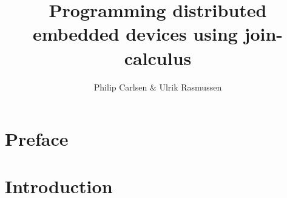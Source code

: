 \documentclass[a4paper, oneside, draft]{memoir}
\title{Programming distributed embedded devices using join-calculus}
\author{Philip Carlsen \& Ulrik Rasmussen}
\begin{document}
\frontmatter

\maketitle

\begin{abstract}

\end{abstract}

\clearpage
\chapter*{Preface}


\clearpage

\tableofcontents*


\mainmatter

\chapter{Introduction}




\end{document}
